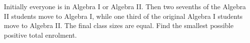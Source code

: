Initially everyone is in Algebra I or Algebra II. Then two sevenths of the Algebra II students move to Algebra I, while one third of the original Algebra I students move to Algebra II. The final class sizes are equal. Find the smallest possible positive total enrolment.
